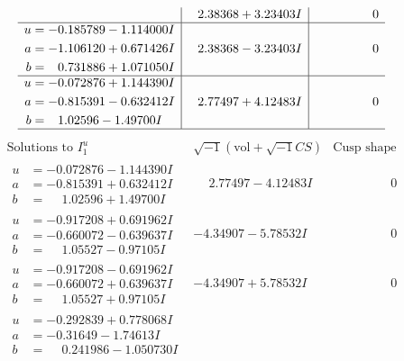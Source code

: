 \documentclass[1p]{elsarticle_modified}
\theoremstyle{definition}
\newcommand{\I}{\sqrt{-1}}
\begin{document}
$$\begin{array}{c|c|c}
 & \phantom{-}2.38368 + 3.23403 I & \phantom{-0.000000 } 0 \\ \hline\begin{aligned}
u &= -0.185789 - 1.114000 I \\
a &= -1.106120 + 0.671426 I \\
b &= \phantom{-}0.731886 + 1.071050 I\end{aligned}
 & \phantom{-}2.38368 - 3.23403 I & \phantom{-0.000000 } 0 \\ \hline\begin{aligned}
u &= -0.072876 + 1.144390 I \\
a &= -0.815391 - 0.632412 I \\
b &= \phantom{-}1.02596 - 1.49700 I\end{aligned}
 & \phantom{-}2.77497 + 4.12483 I & \phantom{-0.000000 } 0\\
 \hline 
 \end{array}$$\newpage$$\begin{array}{c|c|c}  
\text{Solutions to }I^u_{1}& \I (\text{vol} + \sqrt{-1}CS) & \text{Cusp shape}\\
 \hline 
\begin{aligned}
u &= -0.072876 - 1.144390 I \\
a &= -0.815391 + 0.632412 I \\
b &= \phantom{-}1.02596 + 1.49700 I\end{aligned}
 & \phantom{-}2.77497 - 4.12483 I & \phantom{-0.000000 } 0 \\ \hline\begin{aligned}
u &= -0.917208 + 0.691962 I \\
a &= -0.660072 - 0.639637 I \\
b &= \phantom{-}1.05527 - 0.97105 I\end{aligned}
 & -4.34907 - 5.78532 I & \phantom{-0.000000 } 0 \\ \hline\begin{aligned}
u &= -0.917208 - 0.691962 I \\
a &= -0.660072 + 0.639637 I \\
b &= \phantom{-}1.05527 + 0.97105 I\end{aligned}
 & -4.34907 + 5.78532 I & \phantom{-0.000000 } 0 \\ \hline\begin{aligned}
u &= -0.292839 + 0.778068 I \\
a &= -0.31649 - 1.74613 I \\
b &= \phantom{-}0.241986 - 1.050730 I\end{aligned}

\end{array}$$
\end{document}
